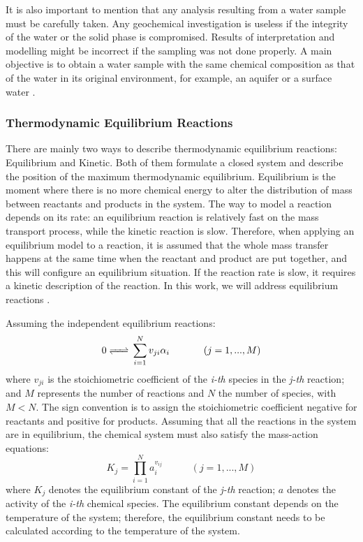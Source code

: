 \documentclass[ppgc,mestrado,English]{iiufrgs}
\begin{document}
It is also important to mention that any analysis resulting from a water sample must be carefully taken. Any geochemical investigation is useless if the integrity of the water or the solid phase is compromised. Results of interpretation and modelling might be incorrect if the sampling was not done properly. A main objective is to obtain a water sample with the same chemical composition as that of the water in its original environment, for example, an aquifer or a surface water \cite{Deutsch:97}.

\subsubsection{Thermodynamic Equilibrium Reactions}
There are mainly two ways to describe thermodynamic equilibrium reactions: Equilibrium and Kinetic. Both of them formulate a closed system and describe the position of the maximum thermodynamic equilibrium. Equilibrium is the moment where there is no more chemical energy to alter the distribution of mass between reactants and products in the system. The way to model a reaction depends on its rate: an equilibrium reaction is relatively fast on the mass transport process, while the kinetic reaction is slow. Therefore, when applying an equilibrium model to a reaction, it is assumed that the whole mass transfer happens at the same time when the reactant and product are put together, and this will configure an equilibrium situation. If the reaction rate is slow, it requires a kinetic description of the reaction. In this work, we will address equilibrium reactions \cite{Nordstrom:86}. 

Assuming the independent equilibrium reactions:
\begin{equation}\label{reaction}
0 \ce{<=>} \sum\limits_{i=1}^N  v_{ji} \alpha_i \hspace{35pt}    (j = 1, ... , M)
\end{equation}
where $v_{ji}$ is the stoichiometric coefficient of the \emph{i-th} species in the \emph{j-th} reaction; and $M$ represents the number of reactions and $N$ the number of species, with $M < N$. The sign convention is to assign the stoichiometric coefficient negative for reactants and positive for products. Assuming that all the reactions in the system are in equilibrium, the chemical system must also satisfy the mass-action equations:
\begin{equation}\label{eq:massaction}
K_j =  \prod\limits_{i=1}^N  a_i^{v_{ij}} \hspace{35pt}    (j = 1, ... , M)
\end{equation}
where $K_j$ denotes the equilibrium constant of the \emph{j-th} reaction; $a$ denotes the activity of the \emph{i-th} chemical species. The equilibrium constant depends on the temperature of the system; therefore, the equilibrium constant needs to be calculated according to the temperature of the system. 
\end{document}
